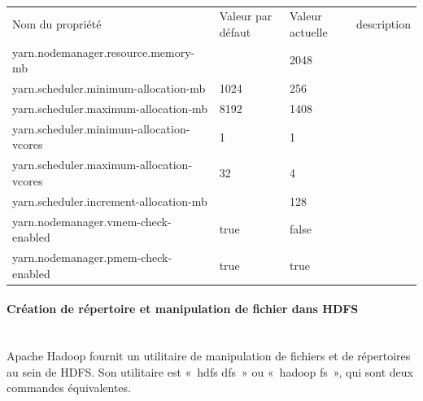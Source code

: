 \documentclass[12pt,french]{book}
\begin{document}
\begin{table}[H]
\begin{tabular}{llll}
\rowcolor[HTML]{4472C4} 
{\color[HTML]{FFFFFF} Nom du propriété}  & {\color[HTML]{FFFFFF} Valeur par défaut} & {\color[HTML]{FFFFFF} Valeur actuelle} & {\color[HTML]{FFFFFF} description} \\
\rowcolor[HTML]{D9E2F3} 
yarn.nodemanager.resource.memory-mb      &                                          & 2048                                   &                                    \\
yarn.scheduler.minimum-allocation-mb     & 1024                                     & 256                                    &                                    \\
\rowcolor[HTML]{D9E2F3} 
yarn.scheduler.maximum-allocation-mb     & 8192                                     & 1408                                   &                                    \\
yarn.scheduler.minimum-allocation-vcores & 1                                        & 1                                      &                                    \\
\rowcolor[HTML]{D9E2F3} 
yarn.scheduler.maximum-allocation-vcores & 32                                       & 4                                      &                                    \\
yarn.scheduler.increment-allocation-mb   &                                          & 128                                    &                                    \\
\rowcolor[HTML]{D9E2F3} 
yarn.nodemanager.vmem-check-enabled      & true                                     & false                                  &                                    \\
yarn.nodemanager.pmem-check-enabled      & true                                     & true                                   &                                   
\end{tabular}
\caption{}
\end{table}

\paragraph{Création de répertoire et manipulation de fichier dans HDFS}\mbox{}\\

Apache Hadoop fournit un utilitaire de manipulation de fichiers et de répertoires au sein de HDFS. Son utilitaire est « hdfs dfs » ou « hadoop fs », qui sont deux commandes équivalentes.
\end{document}
